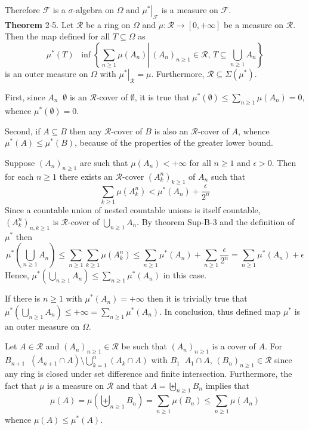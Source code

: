 \documentclass[a4paper]{article}
\newcommand{\obj}[1]{\left\{ #1 \right \}}
\newcommand{\clo}[1]{\left [ #1 \right ]}
\newcommand{\brac}[1]{\left ( #1 \right )}
\newcommand{\induc}[1]{\left . #1 \right \vert}
\newcommand{\Zinf}{\clo{ 0, +\infty }}
\newcommand{\Fcal}{\mathcal{F}}
\newcommand{\defn}{\mathop{\overset{\Delta}{=}}\nolimits}
\begin{document}
Therefore $\Fcal$ is a $\sigma$-algebra on $\Omega$ and $\induc{\mu^\ast}_{\Fcal}$ is a measure on $\Fcal$.\\

\label{thm:outermeasure_ring} \noindent \textbf{Theorem} 2-5.
Let $\mathcal{R}$ be a ring on $\Omega$ and $\mu:\mathcal{R}\to \Zinf$ be a measure on $\mathcal{R}$. Then the map defined for all $T\subseteq \Omega$ as \[\mu^\ast\brac{T}\defn \inf\obj{ \induc{ \sum_{n\geq1} \mu\brac{A_n} }\, \brac{A_n}_{n\geq1}\in \mathcal{R},\, T\subseteq\bigcup_{n\geq1} A_n}\] is an outer measure on $\Omega$ with $\induc{\mu^\ast}_\mathcal{R} = \mu$. Furthermore, $\mathcal{R}\subseteq\Sigma\brac{\mu^\ast}$.

First, since $A_n\defn \emptyset$ is an $\mathcal{R}$-cover of $\emptyset$, it is true that $\mu^\ast\brac{\emptyset}\leq \sum_{n\geq1}\mu\brac{A_n} = 0$, whence $\mu^\ast\brac{\emptyset}=0$.

Second, if $A\subseteq B$ then any $\mathcal{R}$-cover of $B$ is also an $\mathcal{R}$-cover of $A$, whence $\mu^\ast\brac{A}\leq \mu^\ast\brac{B}$, because of the properties of the greater lower bound.

Suppose $\brac{A_n}_{n\geq1}$ are such that $\mu\brac{A_n}<+\infty$ for all $n\geq 1$ and $\epsilon>0$. Then for each $n\geq1$ there exists an $\mathcal{R}$-cover $\brac{A_k^n}_{k\geq1}$ of $A_n$ such that \[\sum_{k\geq1}\mu\brac{A_k^n} <\mu^\ast\brac{A_n}+\frac{\epsilon}{2^n}\] Since a countable union of nested countable unions is itself countable, $\brac{A_k^n}_{n,k\geq1}$ is $\mathcal{R}$-cover of $\bigcup_{n\geq1} A_n$. By theorem Sup-B-3 and the definition of $\mu^\ast$ then \[\mu^\ast\brac{\bigcup_{n\geq1} A_n}\leq \sum_{n\geq1} \sum_{k\geq1} \mu\brac{A_k^n} \leq \sum_{n\geq1}\mu^\ast\brac{A_n}+\sum_{n\geq1}\frac{\epsilon}{2^n} = \sum_{n\geq1}\mu^\ast\brac{A_n}+\epsilon\] Hence, $\mu^\ast\brac{\bigcup_{n\geq1} A_n}\leq \sum_{n\geq1}\mu^\ast\brac{A_n}$ in this case.

If there is $n\geq1$ with $\mu^\ast\brac{A_n}=+\infty$ then it is trivially true that $\mu^\ast\brac{\bigcup_{n\geq1} A_n}\leq +\infty = \sum_{n\geq1}\mu^\ast\brac{A_n}$. In conclusion, thus defined map $\mu^\ast$ is an outer measure on $\Omega$.

Let $A\in \mathcal{R}$ and $\brac{A_n}_{n\geq1}\in \mathcal{R}$ be such that $\brac{A_n}_{n\geq1}$ is a cover of $A$. For $B_{n+1}\defn \brac{A_{n+1}\cap A}\setminus \bigcup_{k=1}^n \brac{A_k\cap A}$ with $B_1\defn A_1\cap A$, $\brac{B_n}_{n\geq1}\in \mathcal{R}$ since any ring is closed under set difference and finite intersection. Furthermore, the fact that $\mu$ is a measure on $\mathcal{R}$ and that $A=\biguplus_{n\geq1} B_n$ implies that \[\mu\brac{A}=\mu\brac{\biguplus_{n\geq1} B_n} = \sum_{n\geq1}\mu\brac{B_n}\leq \sum_{n\geq1}\mu\brac{A_n}\] whence $\mu\brac{A}\leq \mu^\ast\brac{A}$.
\end{document}

